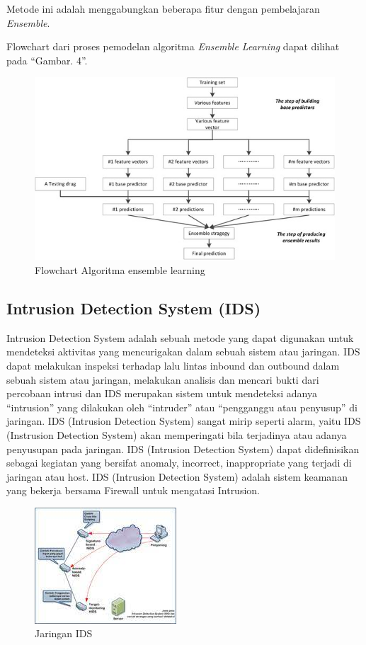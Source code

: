 \documentclass[conference]{IEEEtran}
\begin{document}
Metode ini adalah menggabungkan beberapa fitur dengan pembelajaran \emph{Ensemble}.

Flowchart dari proses pemodelan algoritma \emph{Ensemble Learning} dapat dilihat pada ``Gambar. 4''\cite{zhang}.\vspace{6pt}

\begin{figure}
\centering
\includegraphics[width=.4\textwidth]{Gambar/gambar4.png}
\caption{Flowchart Algoritma ensemble learning}
\end{figure}

\subsection{ Intrusion Detection System (IDS)}\label{IDS}

Intrusion Detection System adalah sebuah metode yang dapat digunakan untuk mendeteksi aktivitas yang mencurigakan dalam sebuah sistem atau jaringan. IDS dapat melakukan inspeksi terhadap lalu lintas inbound dan outbound dalam sebuah sistem atau jaringan, melakukan analisis dan mencari bukti dari percobaan intrusi dan IDS merupakan sistem untuk mendeteksi adanya “intrusion”
yang dilakukan oleh “intruder” atau “pengganggu atau
penyusup” di jaringan. IDS (Intrusion Detection System)
sangat mirip seperti alarm, yaitu IDS (Instrusion Detection System) akan memperingati bila terjadinya atau adanya
penyusupan pada jaringan. IDS (Intrusion Detection System)
dapat didefinisikan sebagai kegiatan yang bersifat anomaly,
incorrect, inappropriate yang terjadi di jaringan atau host. IDS
(Intrusion Detection System) adalah sistem keamanan yang
bekerja bersama Firewall untuk mengatasi Intrusion.


\begin{figure}
\centering
\includegraphics[width=.4\textwidth]{Gambar/gambar6.jpg}
\caption{Jaringan IDS}
\end{figure}
\end{document}
